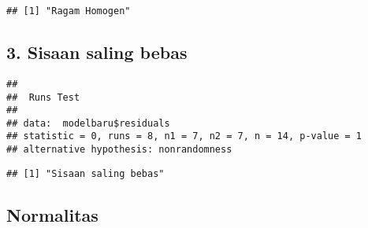 \documentclass[
]{article}
\newenvironment{Shaded}{\begin{snugshade}}{\end{snugshade}}
\newcommand{\FloatTok}[1]{\textcolor[rgb]{0.00,0.00,0.81}{#1}}
\newcommand{\FunctionTok}[1]{\textcolor[rgb]{0.13,0.29,0.53}{\textbf{#1}}}
\newcommand{\NormalTok}[1]{#1}
\newcommand{\OtherTok}[1]{\textcolor[rgb]{0.56,0.35,0.01}{#1}}
\newcommand{\SpecialCharTok}[1]{\textcolor[rgb]{0.81,0.36,0.00}{\textbf{#1}}}
\newcommand{\StringTok}[1]{\textcolor[rgb]{0.31,0.60,0.02}{#1}}
\begin{document}
\begin{Shaded}
\end{Shaded}

\begin{verbatim}
## [1] "Ragam Homogen"
\end{verbatim}

\hypertarget{sisaan-saling-bebas-1}{%
\subsection{3. Sisaan saling bebas}\label{sisaan-saling-bebas-1}}

\begin{Shaded}
\end{Shaded}

\begin{verbatim}
## 
##  Runs Test
## 
## data:  modelbaru$residuals
## statistic = 0, runs = 8, n1 = 7, n2 = 7, n = 14, p-value = 1
## alternative hypothesis: nonrandomness
\end{verbatim}

\begin{Shaded}
\end{Shaded}

\begin{verbatim}
## [1] "Sisaan saling bebas"
\end{verbatim}

\hypertarget{normalitas}{%
\subsection{Normalitas}\label{normalitas}}
\end{document}
